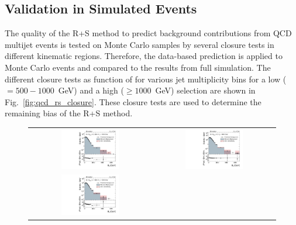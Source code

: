 \subsection{Validation in Simulated Events}
\label{subsec:validation_mc}
The quality of the R+S method to predict background contributions from QCD multijet events is tested on Monte Carlo samples by several closure tests in different kinematic regions. Therefore, the data-based prediction is applied to Monte Carlo events and compared to the results from full simulation. The different closure tests as function of \MHT for various jet multiplicity bins for a low \HT ($= 500 - 1000$~GeV) and a high \HT ($\ge 1000$~GeV) selection are shown in Fig.~\ref{fig:qcd_rs_closure}. These closure tests are used to determine the remaining bias of the R+S method. 
\begin{figure}[!hp]
  \centering
  \begin{tabular}{cc}
                \includegraphics[width=0.49\textwidth]{figures/MHT_JetBin2_HTlow_madgraph_DR53X_chs_TuneZ2star_pt10_withoutPUReweighting_UseRebCorrection_v1.pdf} &
                \includegraphics[width=0.49\textwidth]{figures/MHT_JetBin2_HThigh_madgraph_DR53X_chs_TuneZ2star_pt10_withoutPUReweighting_UseRebCorrection_v1.pdf}\\
                \includegraphics[width=0.49\textwidth]{figures/MHT_JetBin3_HTlow_madgraph_DR53X_chs_TuneZ2star_pt10_withoutPUReweighting_UseRebCorrection_v1.pdf} &

\end{tabular}
\end{figure}
